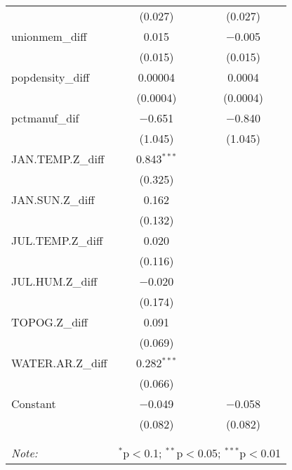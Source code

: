 \begin{table}[!htbp]
\begin{tabular}{@{\extracolsep{5pt}}lcc}
  & (0.027) & (0.027) \\ 
  unionmem\_diff & 0.015 & $-$0.005 \\ 
  & (0.015) & (0.015) \\ 
  popdensity\_diff & 0.00004 & 0.0004 \\ 
  & (0.0004) & (0.0004) \\ 
  pctmanuf\_dif & $-$0.651 & $-$0.840 \\ 
  & (1.045) & (1.045) \\ 
  JAN.TEMP.Z\_diff & 0.843$^{***}$ &  \\ 
  & (0.325) &  \\ 
  JAN.SUN.Z\_diff & 0.162 &  \\ 
  & (0.132) &  \\ 
  JUL.TEMP.Z\_diff & 0.020 &  \\ 
  & (0.116) &  \\ 
  JUL.HUM.Z\_diff & $-$0.020 &  \\ 
  & (0.174) &  \\ 
  TOPOG.Z\_diff & 0.091 &  \\ 
  & (0.069) &  \\ 
  WATER.AR.Z\_diff & 0.282$^{***}$ &  \\ 
  & (0.066) &  \\ 
  Constant & $-$0.049 & $-$0.058 \\ 
  & (0.082) & (0.082) \\ 
 \hline \\[-1.8ex] 
\hline 
\hline \\[-1.8ex] 
\textit{Note:}  & \multicolumn{2}{r}{$^{*}$p$<$0.1; $^{**}$p$<$0.05; $^{***}$p$<$0.01} \\ 
\end{tabular} 
\end{table} 
